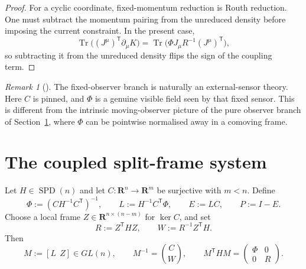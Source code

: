 \documentclass[11pt,a4paper]{article}
\numberwithin{equation}{section}
\DeclareMathOperator{\Tr}{Tr}
\DeclareMathOperator{\SPD}{SPD}
\newcommand{\R}{\mathbf R}
\theoremstyle{thmcompact}
\theoremstyle{remark}
\newtheorem*{remarkplain}{Remark}
\newenvironment{remark}[1][]%
{\begin{remarkbox}\begin{remarkplain}[#1]\normalfont}
{\end{remarkplain}\end{remarkbox}}
\begin{document}
\begin{proof}
For a cyclic coordinate, fixed-momentum reduction is Routh reduction. One must subtract the momentum pairing from the unreduced density before imposing the current constraint. In the present case,
\[
\Tr\bigl((J^\mu)^{\mathsf T}\partial_\mu K\bigr)
=
\Tr\bigl(\Phi J_\mu R^{-1}(J^\mu)^{\mathsf T}\bigr),
\]
so subtracting it from the unreduced density flips the sign of the coupling term.
\end{proof}

\begin{remark}
The fixed-observer branch is naturally an external-sensor theory. Here $C$ is pinned, and $\Phi$ is a genuine visible field seen by that fixed sensor. This is different from the intrinsic moving-observer picture of the pure observer branch of Section~\ref{sec:split-frame}, where $\Phi$ can be pointwise normalised away in a comoving frame.
\end{remark}

\section{The coupled split-frame system}
\label{sec:split-frame}

Let $H\in\SPD(n)$ and let $C:\R^n\to\R^m$ be surjective with $m<n$. Define
\begin{equation}
\Phi:=(CH^{-1}C^{\mathsf T})^{-1},
\qquad
L:=H^{-1}C^{\mathsf T}\Phi,
\qquad
E:=LC,
\qquad
P:=I-E.
\label{eq:basic-defs}
\end{equation}
Choose a local frame $Z\in\R^{n\times(n-m)}$ for $\ker C$, and set
\begin{equation}
R:=Z^{\mathsf T}HZ,
\qquad
W:=R^{-1}Z^{\mathsf T}H.
\label{eq:R-W-defs}
\end{equation}
Then
\begin{equation}
M:=[L\ \ Z]\in GL(n),
\qquad
M^{-1}=\binom{C}{W},
\qquad
M^{\mathsf T}HM=
\begin{pmatrix}
\Phi & 0\\
0 & R
\end{pmatrix}.
\label{eq:split-frame-basic}
\end{equation}
\end{document}
